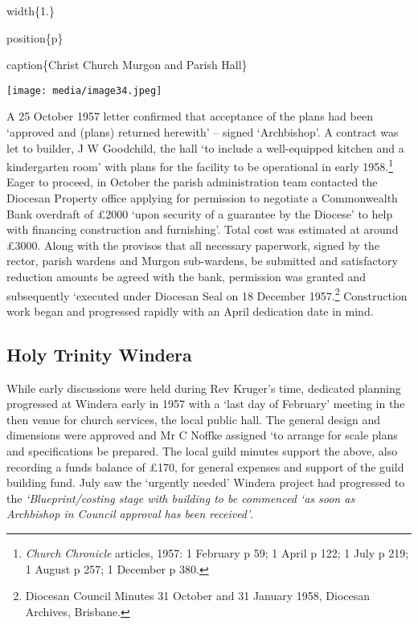 width\{1.\}

position\{p\}

caption\{Christ Church Murgon and Parish Hall\}

\texttt{[image: media/image34.jpeg]}

A 25 October 1957 letter confirmed that acceptance of the plans had been `approved and (plans) returned herewith' -- signed `Archbishop'. A contract was let to builder, J W Goodchild, the hall `to include a well-equipped kitchen and a kindergarten room' with plans for the facility to be operational in early 1958.\footnote{\emph{Church Chronicle} articles, 1957: 1 February p 59; 1 April p 122; 1 July p 219; 1 August p 257; 1 December p 380.} Eager to proceed, in October the parish administration team contacted the Diocesan Property office applying for permission to negotiate a Commonwealth Bank overdraft of £2000 `upon security of a guarantee by the Diocese' to help with financing construction and furnishing'. Total cost was estimated at around £3000. Along with the provisos that all necessary paperwork, signed by the rector, parish wardens and Murgon sub-wardens, be submitted and satisfactory reduction amounts be agreed with the bank, permission was granted and subsequently `executed under Diocesan Seal on 18 December 1957.\footnote{Diocesan Council Minutes 31 October and 31 January 1958, Diocesan Archives, Brisbane.} Construction work began and progressed rapidly with an April dedication date in mind.

\hypertarget{holy-trinity-windera}{%
\subsection{Holy Trinity Windera}\label{holy-trinity-windera}}

While early discussions were held during Rev Kruger's time, dedicated planning progressed at Windera early in 1957 with a `last day of February' meeting in the then venue for church services, the local public hall. The general design and dimensions were approved and Mr C Noffke assigned `to arrange for scale plans and specifications be prepared. The local guild minutes support the above, also recording a funds balance of £170, for general expenses and support of the guild building fund. July saw the `urgently needed' Windera project had progressed to the \emph{`Blueprint/costing stage with building to be commenced `as soon as Archbishop in Council approval has been received'}.

